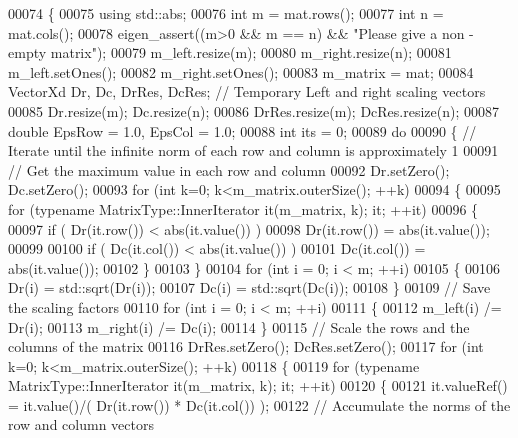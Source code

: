 \begin{DoxyCode}
00074     \{
00075       \textcolor{keyword}{using} std::abs;
00076       \textcolor{keywordtype}{int} m = mat.rows(); 
00077       \textcolor{keywordtype}{int} n = mat.cols();
00078       eigen\_assert((m>0 && m == n) && \textcolor{stringliteral}{"Please give a non - empty matrix"});
00079       m\_left.resize(m); 
00080       m\_right.resize(n);
00081       m\_left.setOnes();
00082       m\_right.setOnes();
00083       m\_matrix = mat;
00084       VectorXd Dr, Dc, DrRes, DcRes; \textcolor{comment}{// Temporary Left and right scaling vectors}
00085       Dr.resize(m); Dc.resize(n);
00086       DrRes.resize(m); DcRes.resize(n);
00087       \textcolor{keywordtype}{double} EpsRow = 1.0, EpsCol = 1.0;
00088       \textcolor{keywordtype}{int} its = 0; 
00089       \textcolor{keywordflow}{do}
00090       \{ \textcolor{comment}{// Iterate until the infinite norm of each row and column is approximately 1}
00091         \textcolor{comment}{// Get the maximum value in each row and column}
00092         Dr.setZero(); Dc.setZero();
00093         \textcolor{keywordflow}{for} (\textcolor{keywordtype}{int} k=0; k<m\_matrix.outerSize(); ++k)
00094         \{
00095           \textcolor{keywordflow}{for} (\textcolor{keyword}{typename} MatrixType::InnerIterator it(m\_matrix, k); it; ++it)
00096           \{
00097             \textcolor{keywordflow}{if} ( Dr(it.row()) < abs(it.value()) )
00098               Dr(it.row()) = abs(it.value());
00099             
00100             \textcolor{keywordflow}{if} ( Dc(it.col()) < abs(it.value()) )
00101               Dc(it.col()) = abs(it.value());
00102           \}
00103         \}
00104         \textcolor{keywordflow}{for} (\textcolor{keywordtype}{int} i = 0; i < m; ++i) 
00105         \{
00106           Dr(i) = std::sqrt(Dr(i));
00107           Dc(i) = std::sqrt(Dc(i));
00108         \}
00109         \textcolor{comment}{// Save the scaling factors }
00110         \textcolor{keywordflow}{for} (\textcolor{keywordtype}{int} i = 0; i < m; ++i) 
00111         \{
00112           m\_left(i) /= Dr(i);
00113           m\_right(i) /= Dc(i);
00114         \}
00115         \textcolor{comment}{// Scale the rows and the columns of the matrix}
00116         DrRes.setZero(); DcRes.setZero(); 
00117         \textcolor{keywordflow}{for} (\textcolor{keywordtype}{int} k=0; k<m\_matrix.outerSize(); ++k)
00118         \{
00119           \textcolor{keywordflow}{for} (\textcolor{keyword}{typename} MatrixType::InnerIterator it(m\_matrix, k); it; ++it)
00120           \{
00121             it.valueRef() = it.value()/( Dr(it.row()) * Dc(it.col()) );
00122             \textcolor{comment}{// Accumulate the norms of the row and column vectors   }

\end{DoxyCode}
